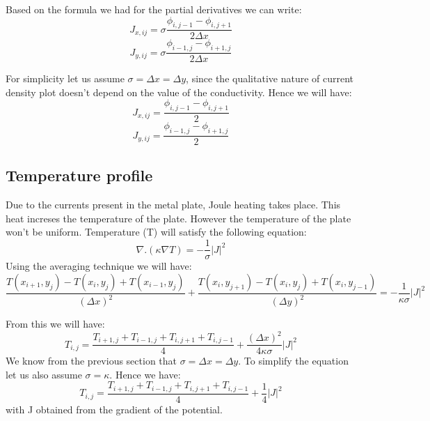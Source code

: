 \documentclass[12pt, a4paper]{article}
\begin{document}
Based on the formula we had for the partial derivatives we can write:
\begin{equation*}
    J_{x,ij} = \sigma \frac{\phi _{i,j-1} - \phi _{i,j+1}}{2 \Delta x}
\end{equation*}
\begin{equation*}
    J_{y,ij} = \sigma \frac{\phi _{i-1,j} - \phi _{i+1,j}}{2 \Delta x}
\end{equation*}

For simplicity let us assume $\sigma = \Delta x = \Delta y$, since the qualitative nature of current density plot doesn't depend on the value of the conductivity.
Hence we will have:
\begin{equation*}
    J_{x,ij} = \frac{\phi _{i,j-1} - \phi _{i,j+1}}{2}
\end{equation*}
\begin{equation*}
    J_{y,ij} = \frac{\phi _{i-1,j} - \phi _{i+1,j}}{2}
\end{equation*}

\subsection{Temperature profile}
Due to the currents present in the metal plate, Joule heating takes place. This heat increses the temperature of the plate. However the temperature of the plate won't be uniform.
Temperature (T) will satisfy the following equation:
\begin{equation*}
    \nabla .(\kappa \nabla T) = -\frac{1}{\sigma}|J|^{2}
\end{equation*}
Using the averaging technique we will have:
\begin{equation*}
    \frac{T(x_{i+1},y_{j}) - T(x_{i},y_{j}) + T(x_{i-1},y_{j})}{(\Delta x)^{2}} + \frac{T(x_{i},y_{j+1}) - T(x_{i},y_{j}) + T(x_{i},y_{j-1})}{(\Delta y)^{2}} = -\frac{1}{\kappa \sigma}|J|^{2}
\end{equation*}

From this we will have:
\begin{equation*}
    T_{i,j} = \frac{T_{i+1,j} + T_{i-1,j} + T_{i,j+1} + T_{i,j-1}}{4} + \frac{(\Delta x)^{2}}{4\kappa \sigma}|J|^{2}
\end{equation*}
We know from the previous section that $\sigma = \Delta x = \Delta y$. To simplify the equation let us also assume $\sigma = \kappa$. Hence we have:
\begin{equation*}
    T_{i,j} = \frac{T_{i+1,j} + T_{i-1,j} + T_{i,j+1} + T_{i,j-1}}{4} + \frac{1}{4}|J|^{2}
\end{equation*}
with J obtained from the gradient of the potential.
\end{document}
